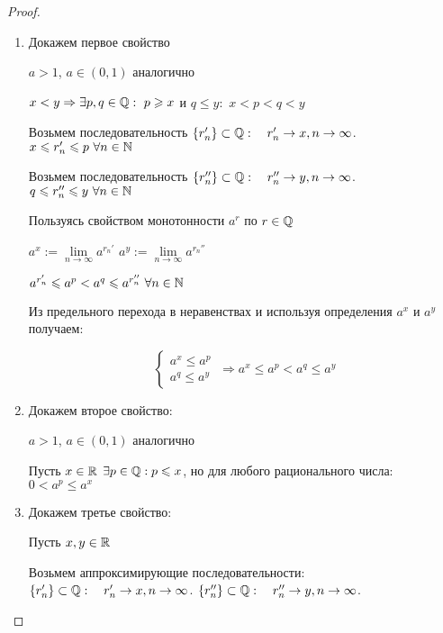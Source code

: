 \begin{proof} 

\begin{enumerate}

    \item Докажем первое свойство
    
    $a > 1$, $a \in (0, 1)$ аналогично
    
    
    $x < y \Rightarrow \exists p, q \in \mathbb{Q}: \ p \geqslant x$ и $ q \leq y:$ $x < p < q < y$\newline
    
    Возьмем последовательность $\{r_{n}'\} \subset \mathbb{Q} : \quad r_{n}' \to x, n \to \infty$. $x \leqslant r_n' \leqslant p  \ \forall n \in \mathbb{N}$ \newline
        
     Возьмем последовательность $\{r_{n}''\} \subset \mathbb{Q} : \quad r_{n}'' \to y, n \to \infty$.
        $q \leqslant r_n'' \leqslant y \ \forall n \in \mathbb{N}$ \newline
        
     Пользуясь свойством монотонности $a^r$ по $r \in \mathbb{Q}$ \newline
        
    $a^{x} := \lim\limits_{n \to \infty} a^{r_{n}'}$ \newline
    $a^{y} := \lim\limits_{n \to \infty} a^{r_{n}''}$
    
    $a^{r_{n}'} \leqslant a^{p} < a^{q} \leqslant a^{r_{n}''} \ \forall n \in \mathbb{N}$
    
    Из предельного перехода в неравенствах и используя определения $a^x$ и $a^y$ получаем:
    
    $$ 
    \left\{
    \begin{array}{l}
        a^x \leq a^p\\ 
        a^q \leq a^y
    \end{array}
    \right.
    \ \Rightarrow a^x \leq a^p < a^q \leq a^y
    $$
    
    \item Докажем второе свойство:
    
    $a > 1$, $a \in (0, 1)$ аналогично
    
    Пусть $x \in \mathbb{R}$\newline
    $\exists p \in \mathbb{Q}: p \leqslant x$, но для любого рационального числа:
    $0 < a^p \leq a^x$

    \item Докажем третье свойство:
    
    Пусть $x, y \in \mathbb{R}$
    
    Возьмем аппроксимирующие последовательности: \newline
    $\{r_{n}'\} \subset \mathbb{Q} : \quad r_{n}' \to x, n \to \infty$.\newline
    $\{r_{n}''\} \subset \mathbb{Q} : \quad r_{n}'' \to y, n \to \infty$.
    

\end{enumerate}
\end{proof}
